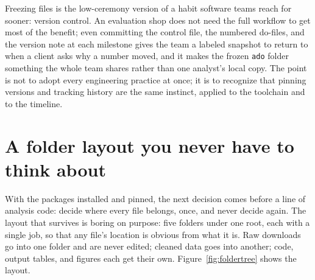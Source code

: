\documentclass[
    a4paper,
    fontsize=10pt,
    twoside=true,
    numbers=noenddot,
]{kaobook}
\begin{document}
Freezing files is the low-ceremony version of a habit software teams reach for sooner: version control. An evaluation shop does not need the full workflow to get most of the benefit; even committing the control file, the numbered do-files, and the version note at each milestone gives the team a labeled snapshot to return to when a client asks why a number moved, and it makes the frozen \texttt{ado} folder something the whole team shares rather than one analyst's local copy. The point is not to adopt every engineering practice at once; it is to recognize that pinning versions and tracking history are the same instinct, applied to the toolchain and to the timeline.

\section{A folder layout you never have to think about}\label{sec:folders}
With the packages installed and pinned, the next decision comes before a line of analysis code: decide where every file belongs, once, and never decide again. The layout that survives is boring on purpose: five folders under one root, each with a single job, so that any file's location is obvious from what it is. Raw downloads go into one folder and are never edited; cleaned data goes into another; code, output tables, and figures each get their own. Figure~\ref{fig:foldertree} shows the layout.
\end{document}
